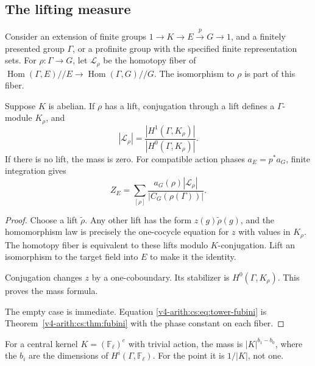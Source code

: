 \subsection{The lifting measure}

Consider an extension of finite groups \(1\to K\to E\xrightarrow{p}G\to1\),
and a finitely presented group \(\Gamma\), or a profinite group with the
specified finite representation sets. For \(\rho:\Gamma\to G\), let
\(\mathcal L_\rho\) be the homotopy fiber of
\(\operatorname{Hom}(\Gamma,E)//E\to \operatorname{Hom}(\Gamma,G)//G\). The
isomorphism to \(\rho\) is part of this fiber.

\begin{proposition}
\label{v4-arith:cs:prop:lifting}
Suppose \(K\) is abelian. If \(\rho\) has a lift, conjugation through a lift
defines a \(\Gamma\)-module \(K_\rho\), and
\begin{equation}
 |\mathcal L_\rho|
       =\frac{|H^1(\Gamma,K_\rho)|}{|H^0(\Gamma,K_\rho)|}.
 \label{v4-arith:cs:eq:lifting-mass}
\end{equation}
If there is no lift, the mass is zero. For compatible action phases
\(a_E=p^*a_G\), finite integration gives
\begin{equation}
 Z_E=\sum_{[\rho]}
      \frac{a_G(\rho)|\mathcal L_\rho|}
           {|C_G(\rho(\Gamma))|}.
 \label{v4-arith:cs:eq:tower-fubini}
\end{equation}
\end{proposition}

\begin{proof}
Choose a lift \(\widetilde\rho\). Any other lift has the form
\(z(g)\widetilde\rho(g)\), and the homomorphism law is precisely the
one-cocycle equation for \(z\) with values in \(K_\rho\). The homotopy fiber
is equivalent to these lifts modulo \(K\)-conjugation. Lift an isomorphism
to the target field into \(E\) to make it the identity.

Conjugation changes \(z\) by a one-coboundary. Its stabilizer is
\(H^0(\Gamma,K_\rho)\). This proves the mass formula.

The empty case is immediate. Equation \eqref{v4-arith:cs:eq:tower-fubini} is
Theorem~\ref{v4-arith:cs:thm:fubini} with the phase constant on each fiber.
\end{proof}

For a central kernel \(K=(\mathbb F_\ell)^e\) with trivial action, the mass
is \(|K|^{b_1-b_0}\), where the \(b_i\) are the dimensions of
\(H^i(\Gamma,\mathbb F_\ell)\). For the point it is \(1/|K|\), not one.

